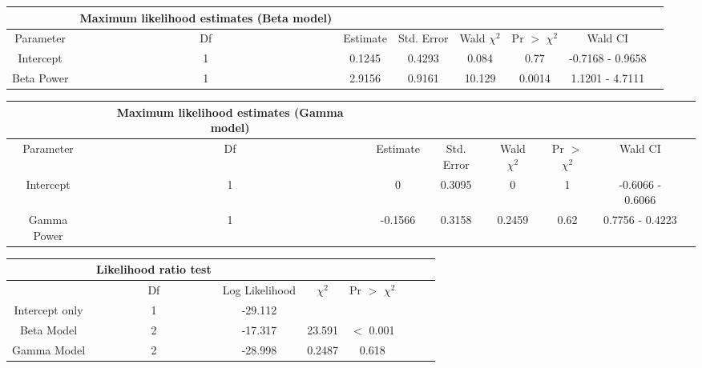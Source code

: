 \documentclass{article}
\begin{document}
\centering
\begin{tabular}{c c c c c c c c}
\toprule
               & Maximum likelihood estimates (Beta model) &                &            &                   &               & &   \\
\midrule
Parameter      & Df                    & Estimate       & Std. Error & Wald \( \chi^2 \)     & Pr $>$ \( \chi^2 \) & Wald CI &  \\
Intercept      & 1                     & 0.1245         & 0.4293     & 0.084             & 0.77          & -0.7168 - 0.9658 & \\
Beta Power     & 1                     & 2.9156         & 0.9161     & 10.129            & 0.0014        & 1.1201 - 4.7111  &\\
\bottomrule
\end{tabular}

\pagebreak

\begin{tabular}{c c c c c c c c}
\toprule
               & Maximum likelihood estimates (Gamma model) &                &            &                   &               & &   \\
\midrule
Parameter      & Df                    & Estimate       & Std. Error & Wald \( \chi^2 \)     & Pr $>$ \( \chi^2 \) & Wald CI &  \\
Intercept      & 1                     & 0         & 0.3095     & 0             & 1          & -0.6066 - 0.6066 & \\
Gamma Power     & 1                     & -0.1566         & 0.3158     & 0.2459            & 0.62        & 0.7756 - 0.4223  &\\
\bottomrule
\end{tabular}

\pagebreak

\begin{tabular}{c c c c c c c c}
\toprule
               & Likelihood ratio test &                &            &                   &               &   &\\
\midrule
               & Df                    & Log Likelihood & \( \chi^2 \) & Pr $>$ \( \chi^2 \)                  & &              &   \\
Intercept only & 1                     & -29.112        &            &                   &               &   &\\
Beta Model     & 2                     & -17.317        & 23.591     & $<$ 0.001 &               &   &\\
Gamma Model    & 2                     & -28.998        & 0.2487     & 0.618             &               &  & \\
\bottomrule
\end{tabular}
\end{document}
